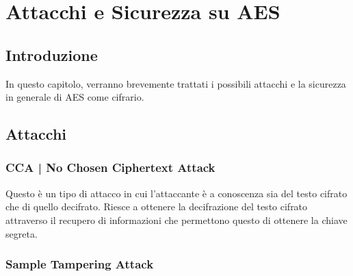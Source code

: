 
\chapter{Attacchi e Sicurezza su AES} %





\section{Introduzione}

\textsf{\small In questo capitolo, verranno brevemente trattati i possibili attacchi e la sicurezza in generale di AES come cifrario.}


\section{Attacchi}

\textsf{\small }

\subsection{CCA | No Chosen Ciphertext Attack}

\textsf{\small Questo è un tipo di attacco in cui l'attaccante è a conoscenza sia del testo cifrato che di quello decifrato. Riesce a ottenere la decifrazione del testo cifrato attraverso il recupero di informazioni che permettono questo di ottenere la chiave segreta.}



\subsection{Sample Tampering Attack}

